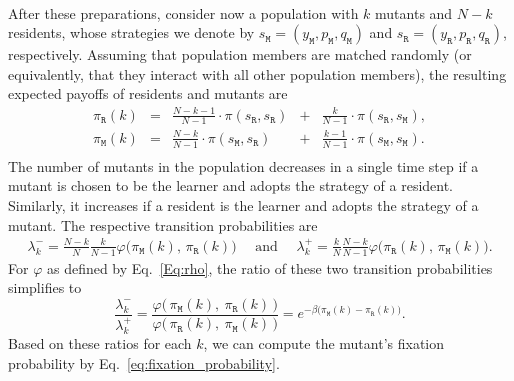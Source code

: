 \documentclass[11pt]{article}
\def\resident{\texttt{R}}
\def\mutant{\texttt{M}}
\def\strategy{s}
\theoremstyle{plainCl1}
\theoremstyle{plainCl2}
\begin{document}
~\\
\noindent
After these preparations, consider now a population with \(k\) mutants and \(N - k\) residents, whose strategies we denote by \(\strategy_\mutant=(y_\mutant,p_\mutant, q_\mutant)\) and \(\strategy_\resident = (y_\resident, p_\resident, q_\resident)\), respectively.
Assuming that population members are matched randomly (or equivalently, that they interact with all other population members), the resulting expected payoffs of residents and mutants are
\begin{equation} \label{Eq:ExpPay}
  \begin{array}{lcrcr}
  \displaystyle \pi_\resident(k)& = &\displaystyle \frac{N\!-\!k\!-\!1}{N-1}\cdot \pi(\strategy_\resident,\strategy_\resident)	&+	&\displaystyle\frac{k}{N-1}\cdot \pi(\strategy_\resident,\strategy_\mutant),\\[0.5cm]
  \displaystyle \pi_\mutant(k)& = &\displaystyle\frac{N-k}{N-1}\cdot \pi(\strategy_\mutant,\strategy_\resident) &+	&\displaystyle\frac{k-1}{N-1}\cdot \pi(\strategy_\mutant,\strategy_\mutant).\\
  \end{array}
\end{equation}
The number of mutants in the population decreases in a single time step if a mutant is chosen to be the learner and adopts the strategy
of a resident. 
Similarly, it increases if a resident is the learner and adopts the strategy of a mutant. 
The respective transition probabilities are 
\begin{align*}
  \lambda^-_k \!=\! \frac{N-k}{N}\frac{k}{N-1}\varphi\big(\pi_\mutant(k),\,\pi_\resident(k)\big) \quad \text{ and } \quad \lambda^+_k \!=\!\frac{k}{N}\frac{N-k}{N-1}\varphi\big(\pi_\resident(k),\,\pi_\mutant(k)\big).
\end{align*}
For $\varphi$ as defined by Eq.~\eqref{Eq:rho}, the ratio of these two transition probabilities simplifies to 
\begin{equation} \label{eq:LambdaRatio}
 \frac{\lambda^-_k}{\lambda^+_k} \!=\!  \frac{\varphi\big(\,\pi_\mutant(k),~\pi_\resident(k)\,\big)}{\varphi\big(\,\pi_\resident(k),~\pi_\mutant(k)\,\big)} 
 =e^{-\beta\big(\pi_\mutant(k)-\pi_\resident(k)\big)}.
\end{equation}
Based on these ratios for each $k$, we can compute the mutant's fixation probability by Eq.~\eqref{eq:fixation_probability}. 

\end{document}
